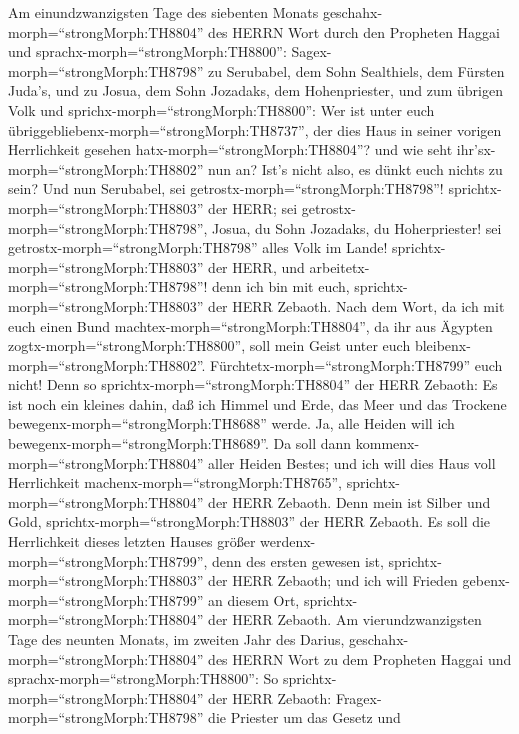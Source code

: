  Am einundzwanzigsten Tage des siebenten Monats
geschahx-morph=``strongMorph:TH8804'' des HERRN Wort durch den Propheten
Haggai und sprachx-morph=``strongMorph:TH8800'': 
Sagex-morph=``strongMorph:TH8798'' zu Serubabel, dem Sohn Sealthiels,
dem Fürsten Juda's, und zu Josua, dem Sohn Jozadaks, dem Hohenpriester,
und zum übrigen Volk und sprichx-morph=``strongMorph:TH8800'':
 Wer ist unter euch
übriggebliebenx-morph=``strongMorph:TH8737'', der dies Haus in seiner
vorigen Herrlichkeit gesehen hatx-morph=``strongMorph:TH8804''? und wie
seht ihr'sx-morph=``strongMorph:TH8802'' nun an? Ist's nicht also, es
dünkt euch nichts zu sein?  Und nun Serubabel, sei
getrostx-morph=``strongMorph:TH8798''!
sprichtx-morph=``strongMorph:TH8803'' der HERR; sei
getrostx-morph=``strongMorph:TH8798'', Josua, du Sohn Jozadaks, du
Hoherpriester! sei getrostx-morph=``strongMorph:TH8798'' alles Volk im
Lande! sprichtx-morph=``strongMorph:TH8803'' der HERR, und
arbeitetx-morph=``strongMorph:TH8798''! denn ich bin mit euch,
sprichtx-morph=``strongMorph:TH8803'' der HERR Zebaoth. 
Nach dem Wort, da ich mit euch einen Bund
machtex-morph=``strongMorph:TH8804'', da ihr aus Ägypten
zogtx-morph=``strongMorph:TH8800'', soll mein Geist unter euch
bleibenx-morph=``strongMorph:TH8802''.
Fürchtetx-morph=``strongMorph:TH8799'' euch nicht!  Denn so
sprichtx-morph=``strongMorph:TH8804'' der HERR Zebaoth: Es ist noch ein
kleines dahin, daß ich Himmel und Erde, das Meer und das Trockene
bewegenx-morph=``strongMorph:TH8688'' werde.  Ja, alle
Heiden will ich bewegenx-morph=``strongMorph:TH8689''. Da soll dann
kommenx-morph=``strongMorph:TH8804'' aller Heiden Bestes; und ich will
dies Haus voll Herrlichkeit machenx-morph=``strongMorph:TH8765'',
sprichtx-morph=``strongMorph:TH8804'' der HERR Zebaoth. 
Denn mein ist Silber und Gold, sprichtx-morph=``strongMorph:TH8803'' der
HERR Zebaoth.  Es soll die Herrlichkeit dieses letzten
Hauses größer werdenx-morph=``strongMorph:TH8799'', denn des ersten
gewesen ist, sprichtx-morph=``strongMorph:TH8803'' der HERR Zebaoth; und
ich will Frieden gebenx-morph=``strongMorph:TH8799'' an diesem Ort,
sprichtx-morph=``strongMorph:TH8804'' der HERR Zebaoth.  Am
vierundzwanzigsten Tage des neunten Monats, im zweiten Jahr des Darius,
geschahx-morph=``strongMorph:TH8804'' des HERRN Wort zu dem Propheten
Haggai und sprachx-morph=``strongMorph:TH8800'':  So
sprichtx-morph=``strongMorph:TH8804'' der HERR Zebaoth:
Fragex-morph=``strongMorph:TH8798'' die Priester um das Gesetz und
